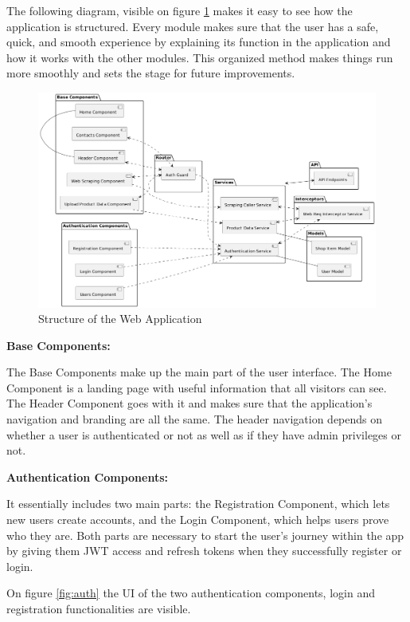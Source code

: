 The following diagram, visible on figure \ref{fig:webappstruct} makes it easy to see how the application is structured. Every module makes sure that the user has a safe, quick, and smooth experience by explaining its function in the application and how it works with the other modules. This organized method makes things run more smoothly and sets the stage for future improvements.

\begin{figure}[H]
	\centering
	\includegraphics[width=1\linewidth]{img/website_structure.png}
	\caption{Structure of the Web Application}
	\label{fig:webappstruct}
\end{figure}

\noindent\textbf{Base Components: }

The Base Components make up the main part of the user interface. The Home Component is a landing page with useful information that all visitors can see. The Header Component goes with it and makes sure that the application's navigation and branding are all the same. The header navigation depends on whether a user is authenticated or not as well as if they have admin privileges or not. 

\noindent\textbf{Authentication Components:}

It essentially includes two main parts: the Registration Component, which lets new users create accounts, and the Login Component, which helps users prove who they are. Both parts are necessary to start the user's journey within the app by giving them JWT access and refresh tokens when they successfully register or login.

On figure \ref{fig:auth} the UI of the two authentication components, login and registration functionalities are visible. 

